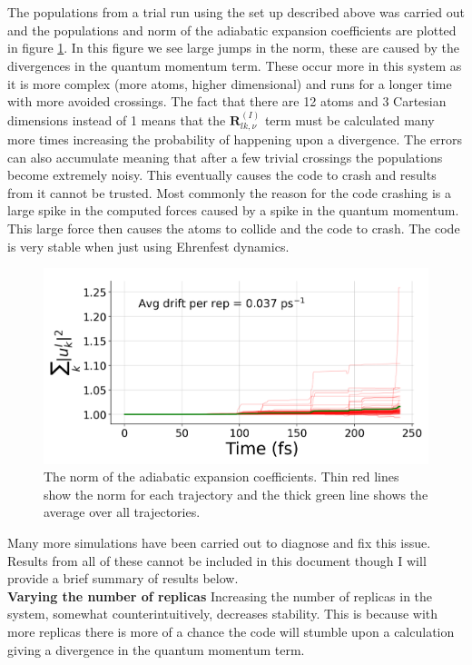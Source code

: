 \\\\
The populations from a trial run using the set up described above was carried out and the populations and norm of the adiabatic expansion coefficients are plotted in figure \ref{fig:CP2K_norm}. In this figure we see large jumps in the norm, these are caused by the divergences in the quantum momentum term. These occur more in this system as it is more complex (more atoms, higher dimensional) and runs for a longer time with more avoided crossings. The fact that there are 12 atoms and 3 Cartesian dimensions instead of 1 means that the $\mathbf{R}_{lk, \nu}^{(I)}$ term must be calculated many more times increasing the probability of happening upon a divergence. The errors can also accumulate meaning that after a few trivial crossings the populations become extremely noisy. This eventually causes the code to crash and results from it cannot be trusted. Most commonly the reason for the code crashing is a large spike in the computed forces caused by a spike in the quantum momentum. This large force then causes the atoms to collide and the code to crash. The code is very stable when just using Ehrenfest dynamics.
\begin{figure}[h]
  \includegraphics[width=\textwidth]{./img/CTMQC/Ethylene_norm.png}
  \caption{\label{fig:CP2K_norm}The norm of the adiabatic expansion coefficients. Thin red lines show the norm for each trajectory and the thick green line shows the average over all trajectories.}
\end{figure}
Many more simulations have been carried out to diagnose and fix this issue. Results from all of these cannot be included in this document though I will provide a brief summary of results below.
\\
\textbf{Varying the number of replicas}
Increasing the number of replicas in the system, somewhat counterintuitively, decreases stability. This is because with more replicas there is more of a chance the code will stumble upon a calculation giving a divergence in the quantum momentum term.

